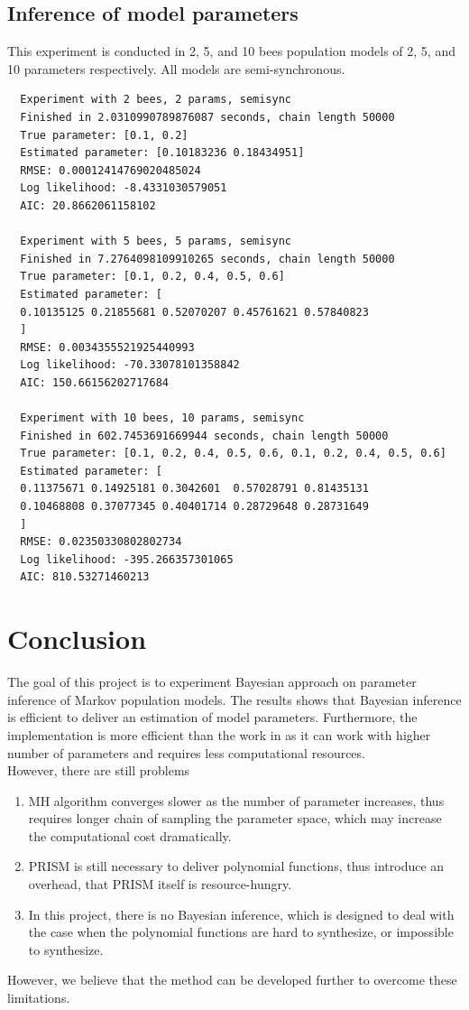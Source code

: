 \documentclass[12pt]{article}
\theoremstyle{definition}
\begin{document}
\subsection{Inference of model parameters}
This experiment is conducted in 2, 5, and 10 bees population models of 2, 5, and 10
parameters respectively. All models are semi-synchronous.\\
\begin{lstlisting}
  Experiment with 2 bees, 2 params, semisync
  Finished in 2.0310990789876087 seconds, chain length 50000
  True parameter: [0.1, 0.2]
  Estimated parameter: [0.10183236 0.18434951]
  RMSE: 0.00012414769020485024
  Log likelihood: -8.4331030579051
  AIC: 20.8662061158102

  Experiment with 5 bees, 5 params, semisync
  Finished in 7.2764098109910265 seconds, chain length 50000
  True parameter: [0.1, 0.2, 0.4, 0.5, 0.6]
  Estimated parameter: [
  0.10135125 0.21855681 0.52070207 0.45761621 0.57840823
  ]
  RMSE: 0.0034355521925440993
  Log likelihood: -70.33078101358842
  AIC: 150.66156202717684

  Experiment with 10 bees, 10 params, semisync
  Finished in 602.7453691669944 seconds, chain length 50000
  True parameter: [0.1, 0.2, 0.4, 0.5, 0.6, 0.1, 0.2, 0.4, 0.5, 0.6]
  Estimated parameter: [
  0.11375671 0.14925181 0.3042601  0.57028791 0.81435131
  0.10468808 0.37077345 0.40401714 0.28729648 0.28731649
  ]
  RMSE: 0.02350330802802734
  Log likelihood: -395.266357301065
  AIC: 810.53271460213

\end{lstlisting}

\section{Conclusion}
The goal of this project is to experiment Bayesian approach on parameter
inference of Markov population models. The results shows that Bayesian inference
is efficient to deliver an estimation of model parameters. Furthermore, the
implementation is more efficient than the work in \cite{hajnal2019data} as it
can work with higher number of parameters and requires less computational
resources.\\
However, there are still problems
\begin{enumerate}
\item MH algorithm converges slower as the number of parameter increases, thus
  requires longer chain of sampling the parameter space, which may increase the
  computational cost dramatically.
\item PRISM is still necessary to deliver polynomial functions, thus introduce
  an overhead, that PRISM itself is resource-hungry.
\item In this project, there is no Bayesian inference, which is designed to deal
  with the case when the polynomial functions are hard to synthesize, or
  impossible to synthesize.
\end{enumerate}
However, we believe that the method can be developed further to overcome these limitations.
\end{document}
